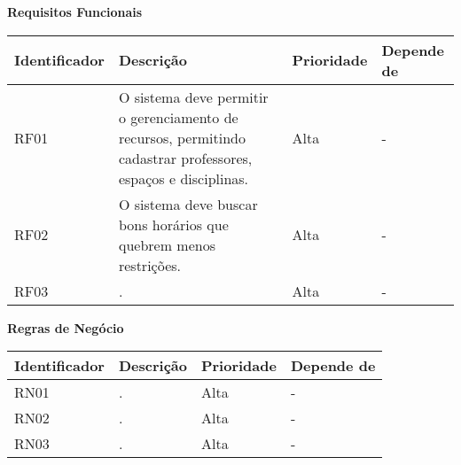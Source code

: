 \documentclass[a4paper, 12pt]{article}
\begin{document}
	
		
	\begin{landscape}
		
		\noindent \textbf{Requisitos Funcionais}
		
		\begin{table}[htp]
			\begin{center}
				\begin{tabular}{|p{3cm}|p{12.5cm}|p{2.5cm}|p{6cm}|}
					\hline
					\textbf{Identificador} & \textbf{Descrição} & \textbf{Prioridade} & \textbf{Depende de} \\
					\hline
					RF01 & O sistema deve permitir o gerenciamento de recursos, permitindo cadastrar professores, espaços e disciplinas. & Alta & - \\
					\hline
					RF02 & O sistema deve buscar bons horários que quebrem menos restrições. & Alta & - \\
					\hline
					RF03 & . & Alta & - \\
					\hline
				\end{tabular}
			\end{center}
		\end{table}
	\end{landscape}
	
	
	\newpage
	
	\begin{landscape}
		
		\noindent \textbf{Regras de Negócio}
		
		\begin{table}[htp]
			\begin{center}
				\begin{tabular}{|p{3cm}|p{12.5cm}|p{2.5cm}|p{6cm}|}
					\hline
					\textbf{Identificador} & \textbf{Descrição} & \textbf{Prioridade} & \textbf{Depende de} \\
					\hline
					RN01 & . & Alta & - \\
					\hline
					RN02 & . & Alta & - \\
					\hline
					RN03 & . & Alta & - \\
					\hline
				\end{tabular}
			\end{center}
		\end{table}
	\end{landscape}
	
	
	
	
\end{document}
